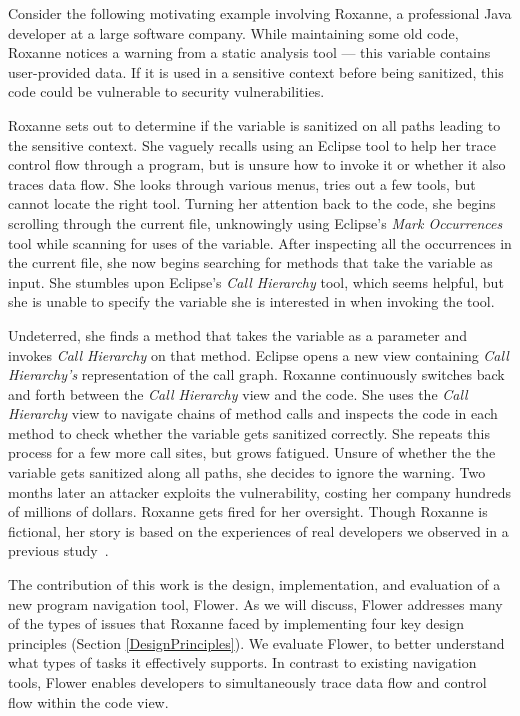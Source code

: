 \documentclass[conference]{IEEEtran}
\begin{document}

Consider the following motivating example involving Roxanne, a professional Java developer at a large software company.
While maintaining some old code, Roxanne notices a warning from a static analysis tool --- this variable contains user-provided data. 
If it is used in a sensitive context before being sanitized, this code could be vulnerable to security vulnerabilities.

Roxanne sets out to determine if the variable is sanitized on all paths leading to the sensitive context.
She vaguely recalls using an Eclipse tool to help her trace control flow through a program, but is unsure how to invoke it or whether it also traces data flow.
She looks through various menus, tries out a few tools, but cannot locate the right tool.
Turning her attention back to the code, she begins scrolling through the current file, unknowingly using Eclipse's \emph{Mark Occurrences} tool while scanning for uses of the variable. 
After inspecting all the occurrences in the current file, she now begins searching for methods that take the variable as input.
She stumbles upon Eclipse's \emph{Call Hierarchy} tool, which seems helpful, but she is unable to specify the variable she is interested in when invoking the tool.

Undeterred, she finds a method that takes the variable as a parameter and invokes \emph{Call Hierarchy} on that method.
Eclipse opens a new view containing \emph{Call Hierarchy's} representation of the call graph.
Roxanne continuously switches back and forth between the \emph{Call Hierarchy} view and the code.
She uses the \emph{Call Hierarchy} view to navigate chains of method calls and inspects the code in each method to check whether the variable gets sanitized correctly.
She repeats this process for a few more call sites, but grows fatigued. 
Unsure of whether the the variable gets sanitized along all paths, she decides to ignore the warning.
Two months later an attacker exploits the vulnerability, costing her company hundreds of millions of dollars. 
Roxanne gets fired for her oversight. 
Though Roxanne is fictional, her story is based on the experiences of real developers we observed in a previous study~\cite{Smith2015}.

The contribution of this work is the design, implementation, and evaluation of a new program navigation tool, Flower.
As we will discuss, Flower  addresses many of the types of issues that Roxanne faced by implementing four key design principles (Section \ref{DesignPrinciples}).
We evaluate Flower, to better understand what types of tasks it effectively supports. 
In contrast to existing navigation tools, Flower  enables developers to simultaneously trace data flow and control flow within the code view. 
\end{document}
